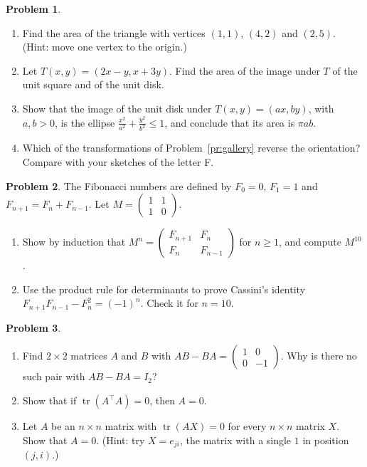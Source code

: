 \documentclass[11pt]{article}
\theoremstyle{definition}
\newtheorem{problem}{Problem}[section]
\DeclareMathOperator{\tr}{tr}
\begin{document}
\begin{problem}\label{pr:area}
    \begin{enumerate}[label=(\alph*)]
        \item Find the area of the triangle with vertices $(1, 1)$, $(4, 2)$ and $(2, 5)$. (Hint: move one vertex to the origin.)
        \item Let $T(x, y) = (2x - y, x + 3y)$. Find the area of the image under $T$ of the unit square and of the unit disk.
        \item Show that the image of the unit disk under $T(x, y) = (ax, by)$, with $a, b > 0$, is the ellipse $\frac{x^2}{a^2} + \frac{y^2}{b^2} \leq 1$, and conclude that its area is $\pi ab$.
        \item Which of the transformations of Problem~\ref{pr:gallery} reverse the orientation? Compare with your sketches of the letter F.
    \end{enumerate}
\end{problem}

\begin{problem}\label{pr:fibonacci}
    The Fibonacci numbers are defined by $F_0 = 0$, $F_1 = 1$ and $F_{n+1} = F_n + F_{n-1}$. Let $M = \begin{pmatrix} 1 & 1 \\ 1 & 0 \end{pmatrix}$.
    \begin{enumerate}[label=(\alph*)]
        \item Show by induction that $M^n = \begin{pmatrix} F_{n+1} & F_n \\ F_n & F_{n-1} \end{pmatrix}$ for $n \geq 1$, and compute $M^{10}$.
        \item Use the product rule for determinants to prove Cassini's identity $F_{n+1}F_{n-1} - F_n^2 = (-1)^n$. Check it for $n = 10$.
    \end{enumerate}
\end{problem}

\begin{problem}\label{pr:trace}
    \begin{enumerate}[label=(\alph*)]
        \item Find $2 \times 2$ matrices $A$ and $B$ with $AB - BA = \begin{pmatrix} 1 & 0 \\ 0 & -1 \end{pmatrix}$. Why is there no such pair with $AB - BA = I_2$?
        \item Show that if $\tr(A^\top A) = 0$, then $A = 0$.
        \item Let $A$ be an $n \times n$ matrix with $\tr(AX) = 0$ for every $n \times n$ matrix $X$. Show that $A = 0$. (Hint: try $X = e_{ji}$, the matrix with a single $1$ in position $(j, i)$.)
    \end{enumerate}
\end{problem}
\end{document}
